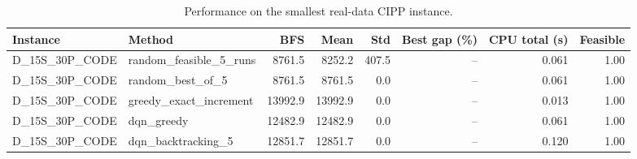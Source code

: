 \begin{table}[t]
\centering
\caption{Performance on the smallest real-data CIPP instance.}
\begin{tabular}{llrrrrrr}
\toprule
Instance & Method & BFS & Mean & Std & Best gap (\%) & CPU total (s) & Feasible \\
\midrule
D\_15S\_30P\_CODE & random\_feasible\_5\_runs & 8761.5 & 8252.2 & 407.5 & -- & 0.061 & 1.00 \\
D\_15S\_30P\_CODE & random\_best\_of\_5 & 8761.5 & 8761.5 & 0.0 & -- & 0.061 & 1.00 \\
D\_15S\_30P\_CODE & greedy\_exact\_increment & 13992.9 & 13992.9 & 0.0 & -- & 0.013 & 1.00 \\
D\_15S\_30P\_CODE & dqn\_greedy & 12482.9 & 12482.9 & 0.0 & -- & 0.061 & 1.00 \\
D\_15S\_30P\_CODE & dqn\_backtracking\_5 & 12851.7 & 12851.7 & 0.0 & -- & 0.120 & 1.00 \\
\bottomrule
\end{tabular}
\end{table}
